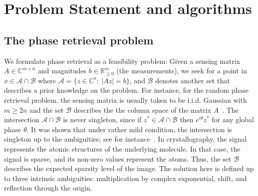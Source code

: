 \documentclass[12pt]{article}
\theoremstyle{definition}
\theoremstyle{remark}
\theoremstyle{definition}
\theoremstyle{problem}
\theoremstyle{definition}
\newcommand{\RR}{\mathbb{R} }
\newcommand{\CC}{\mathbb{C}}
\newcommand{\A}{\mathcal{A}}
\newcommand{\B}{\mathcal{B}}
\newcommand{\TODO}[1]{{\color{red}{[#1]}}}
\begin{document}
 \TODO{This is currently unclear: ``As will be shown, all the three are special cases of the DR framework. However, the analysis of DR is limited to convex sets...''; we should make it clear that PR is basically a problem of finding the intersection of two sets (in the absence of noise), otherwise it will not be clear what do we it has to do with convex/non-convex sets.}

\TODO{Need to outline the paper}



\section{Problem Statement and algorithms}

\subsection{The phase retrieval problem}

We formulate phase retrieval as a feasibility problem: Given a sensing matrix $A\in\CC^{m\times n}$ and magnitudes $b\in\RR^{m}_{\geq 0}$ (the measurements), we seek for a point in 
$x\in\A\cap \B $ where $\A=\{z\in\CC^n:\ |Az|=b\}$, and $\B$ denotes another set that describes a prior knowledge on the problem. 
For instance, for the random phase retrieval problem, the sensing matrix is usually taken to be  i.i.d. Gaussian with $m\geq 2n$ and the set $\B$ describes the the column space of the matrix $A$~\cite{candes2015phase}. 
The intersection $\A\cap\B$ is never singleton, since if $z^*\in\A\cap\B$ then $e^{i\theta}z^*$ for any global phase $\theta$. It was shown that under rather mild condition, the intersection is singleton up to the ambiguities; see for instance~\cite{balan2006signal, Bandeira2014,Conca2015}. 
In crystallography, the signal represents the atomic structures of the underlying molecule. In that case, the signal is sparse, and its non-zero values represent the atoms. Thus, the set $\B$ describes the expected sparsity level of the image. 
The solution here is defined up to three intrinsic ambiguities: multiplication by complex exponential, shift, and reflection through the origin.   
\end{document}
